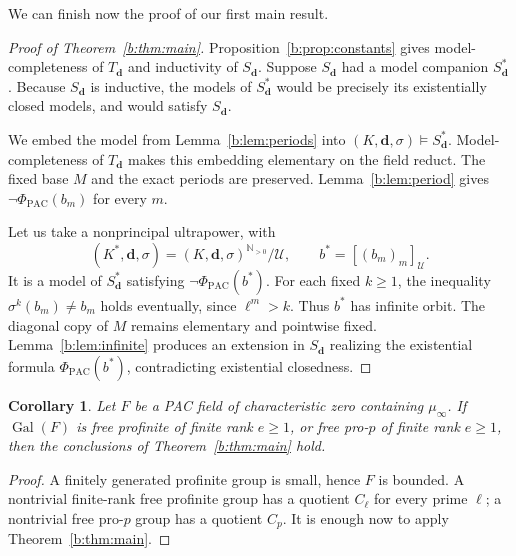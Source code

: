 \documentclass[11pt,a4paper]{amsart}
\renewcommand{\ge}{\geqslant}
\newtheorem{corollary}[theorem]{Corollary}
\theoremstyle{definition}
\newcommand{\N}{\mathbb N}
\newcommand{\bd}{\boldsymbol d}
\DeclareMathOperator{\Gal}{Gal}
\begin{document}
We can finish now the proof of our first main result.
\begin{proof}[Proof of Theorem~\ref{b:thm:main}]
Proposition~\ref{b:prop:constants} gives model-completeness of $T_{\bd}$
and inductivity of $S_{\bd}$. Suppose $S_{\bd}$ had a model companion
$S_{\bd}^*$. Because $S_{\bd}$ is inductive, the models of $S_{\bd}^*$
would be precisely its existentially closed models, and would
satisfy $S_{\bd}$.

We embed the model from Lemma~\ref{b:lem:periods} into
$(K,\bd,\sigma)\models S_{\bd}^*$. Model-completeness of $T_{\bd}$
makes this embedding elementary on the field reduct. The fixed base
$M$ and the exact periods are preserved. Lemma~\ref{b:lem:period}
gives $\neg\Phi_{\mathrm{PAC}}(b_m)$ for every $m$.

Let us take a nonprincipal ultrapower, with
\[
(K^*,\bd,\sigma)=(K,\bd,\sigma)^{\N_{>0}}/\mathcal U,\qquad
b^*=[(b_m)_m]_{\mathcal U}.
\]
It is a model of $S_{\bd}^*$ satisfying $\neg\Phi_{\mathrm{PAC}}(b^*)$. For each fixed
$k\ge1$, the inequality $\sigma^k(b_m)\ne b_m$ holds eventually,
since $\ell^m>k$. Thus $b^*$ has infinite orbit. The diagonal copy
of $M$ remains elementary and pointwise fixed. Lemma~\ref{b:lem:infinite}
produces an extension in $S_{\bd}$ realizing the existential formula
$\Phi_{\mathrm{PAC}}(b^*)$, contradicting existential closedness.
\end{proof}


\begin{corollary}\label{b:cor:free}
Let $F$ be a PAC field of characteristic zero containing $\mu_\infty$.
If $\Gal(F)$ is free profinite of finite rank $e\ge1$, or free
pro-$p$ of finite rank $e\ge1$, then the conclusions of
Theorem~\ref{b:thm:main} hold.
\end{corollary}

\begin{proof}
A finitely generated profinite group is small, hence $F$ is bounded.
A nontrivial finite-rank free profinite group has a quotient $C_\ell$
for every prime $\ell$; a nontrivial free pro-$p$ group has a quotient
$C_p$. It is enough now to apply Theorem~\ref{b:thm:main}.
\end{proof}
\end{document}
